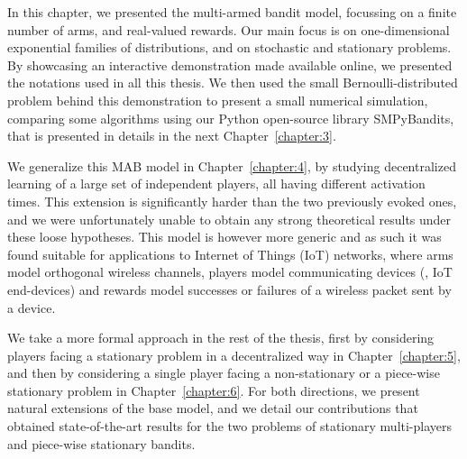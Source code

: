 In this chapter, we presented the multi-armed bandit model, focussing on a finite number of arms, and real-valued rewards.
Our main focus is on one-dimensional exponential families of distributions, and on stochastic and stationary problems.
By showcasing an interactive demonstration made available online,
we presented the notations used in all this thesis.
%
We then used the small Bernoulli-distributed problem behind this demonstration
to present a small numerical simulation, comparing some algorithms using our Python open-source library SMPyBandits, that is presented in details in the next Chapter~\ref{chapter:3}.

We generalize this MAB model in Chapter~\ref{chapter:4}, by studying decentralized learning of a large set of independent players, all having different activation times.
This extension is significantly harder than the two previously evoked ones, and we were unfortunately unable to obtain any strong theoretical results under these loose hypotheses.
This model is however more generic and as such it was found suitable for applications to Internet of Things (IoT) networks, where arms model orthogonal wireless channels, players model communicating devices (\ie, IoT end-devices) and rewards model successes or failures of a wireless packet sent by a device.

We take a more formal approach in the rest of the thesis,
first by considering players facing a stationary problem in a decentralized way in Chapter~\ref{chapter:5},
and then by considering a single player facing a non-stationary or a piece-wise stationary problem in Chapter~\ref{chapter:6}.
%
For both directions, we present natural extensions of the base model, and we detail our contributions that obtained state-of-the-art results for the two problems
of stationary multi-players and piece-wise stationary bandits.


